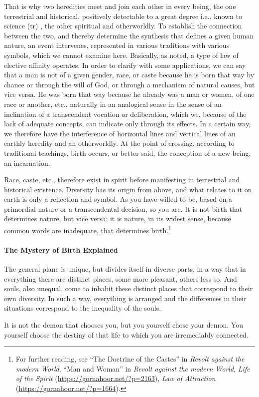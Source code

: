 That is why two heredities meet and join each other in every being, the one terrestrial and historical, positively detectable to a great degree i.e., known to science (tr) , the other spiritual and otherworldly. To establish the connection between the two, and thereby determine the synthesis that defines a given human nature, an event intervenes, represented in various traditions with various symbols, which we cannot examine here. Basically, as noted, a type of law of elective affinity operates. In order to clarify with some applications, we can say that a man is not of a given gender, race, or caste because he is born that way by chance or through the will of God, or through a mechanism of natural causes, but vice versa. He was born that way because he already was a man or women, of one race or another, etc., naturally in an analogical sense in the sense of an inclination of a transcendent vocation or deliberation, which we, because of the lack of adequate concepts, can indicate only through its effects. In a certain way, we therefore have the interference of horizontal lines and vertical lines of an earthly heredity and an otherworldly. At the point of crossing, according to traditional teachings, birth occurs, or better said, the conception of a new being, an incarnation.

Race, caste, etc., therefore exist in spirit before manifesting in terrestrial and historical existence. Diversity has its origin from above, and what relates to it on earth is only a reflection and symbol. As you have willed to be, based on a primordial nature or a transcendental decision, so you are. It is not birth that determines nature, but vice versa; it is nature, in its widest sense, because common words are inadequate, that determines birth.\footnote{For further reading, see ``The Doctrine of the Castes'' in \emph{Revolt against the modern World}, ``Man and Woman'' in \emph{Revolt against the modern World}, \textit{Life of the Spirit} (\url{https://gornahoor.net/?p=2163}), \textit{Law of Attraction} (\url{https://gornahoor.net/?p=1664}).}

\paragraph{The Mystery of Birth Explained}

\begin{quotex}
The general plane is unique, but divides itself in diverse parts, in a way that in everything there are distinct places, some more pleasant, others less so. And souls, also unequal, come to inhabit these distinct places that correspond to their own diversity. In such a way, everything is arranged and the differences in their situations correspond to the inequality of the souls.

It is not the demon that chooses you, but you yourself chose your demon. You yourself choose the destiny of that life to which you are irremediably connected.
\end{quotex}

